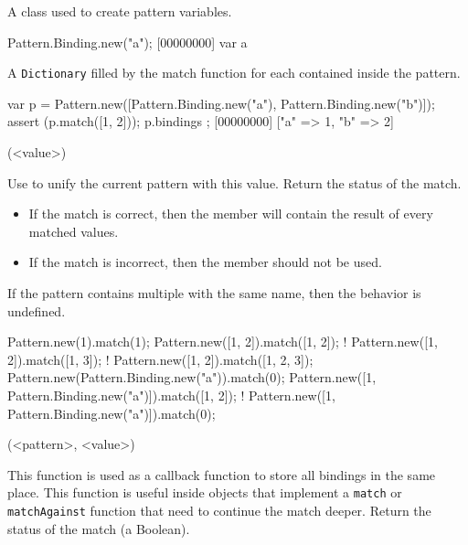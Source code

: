 \begin{urbiscriptapi}

\item[Binding]
  A class used to create pattern variables.

\begin{urbiscript}
Pattern.Binding.new("a");
[00000000] var a
\end{urbiscript}

\item[bindings]

  A \lstinline|Dictionary| filled by the match function for each
   contained inside the pattern.

\begin{urbiscript}
{
  var p = Pattern.new([Pattern.Binding.new("a"), Pattern.Binding.new("b")]);
  assert (p.match([1, 2]));
  p.bindings
};
[00000000] ["a" => 1, "b" => 2]
\end{urbiscript}


\item[match](<value>)%

  Use  to unify the current pattern with this value.
  Return the status of the match.
  \begin{itemize}
    \item If the match is correct, then the  member will
      contain the result of every matched values.
    \item If the match is incorrect, then the  member should
      not be used.
  \end{itemize}
  If the pattern contains multiple  with the same name,
  then the behavior is undefined.

\begin{urbiassert}
Pattern.new(1).match(1);
Pattern.new([1, 2]).match([1, 2]);
! Pattern.new([1, 2]).match([1, 3]);
! Pattern.new([1, 2]).match([1, 2, 3]);
Pattern.new(Pattern.Binding.new("a")).match(0);
Pattern.new([1, Pattern.Binding.new("a")]).match([1, 2]);
! Pattern.new([1, Pattern.Binding.new("a")]).match(0);
\end{urbiassert}


\item[matchPattern](<pattern>, <value>)%

  This function is used as a callback function to store all bindings
  in the same place.  This function is useful inside objects that
  implement a \lstinline|match| or \lstinline|matchAgainst| function
  that need to continue the match deeper.  Return the status of the
  match (a Boolean).


\end{urbiscriptapi}
